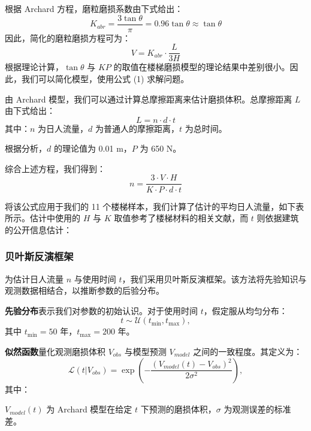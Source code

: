 \documentclass[11pt,a4paper]{ctexart}
\begin{document}
根据 Archard 方程，磨粒磨损系数由下式给出：
\begin{equation}
K_{abr}=\frac{3\tan\theta}{\pi}=0.96\tan\theta\approx\tan\theta \tag{5}
\end{equation}
因此，简化的磨粒磨损方程可为：
\begin{equation}
V=K_{abr}\cdot\frac{L}{3H} \tag{6}
\end{equation}
根据理论计算，$\tan\theta$ 与 $KP$ 的取值在楼梯磨损模型的理论结果中差别很小。因此，我们可以简化模型，使用公式 (1) 求解问题。

由 Archard 模型，我们可以通过计算总摩擦距离来估计磨损体积。总摩擦距离 $L$ 由下式给出：
\begin{equation}
L=n\cdot d\cdot t \tag{7}
\end{equation}
其中：$n$ 为日人流量，$d$ 为普通人的摩擦距离，$t$ 为总时间。

根据分析，$d$ 的理论值为 0.01 m，$P$ 为 650 N。

综合上述方程，我们得到：
\begin{equation}
n=\frac{3\cdot V\cdot H}{K\cdot P\cdot d\cdot t} \tag{8}
\end{equation}

将该公式应用于我们的 11 个楼梯样本，我们计算了估计的平均日人流量，如下表所示。估计中使用的 $H$ 与 $K$ 取值参考了楼梯材料的相关文献，而 $t$ 则依据建筑的公开信息估计：

\subsubsection{贝叶斯反演框架}

为估计日人流量 $n$ 与使用时间 $t$，我们采用贝叶斯反演框架。该方法将先验知识与观测数据相结合，以推断参数的后验分布。

\textbf{先验分布}表示我们对参数的初始认识。对于使用时间 $t$，假定服从均匀分布：
\begin{equation}
t\sim\mathcal{U}(t_{\min},t_{\max}), \tag{9}
\end{equation}
其中 $t_{\min}=50$ 年，$t_{\max}=200$ 年。

\textbf{似然函数}量化观测磨损体积 $V_{obs}$ 与模型预测 $V_{model}$ 之间的一致程度。其定义为：
\begin{equation}
\mathcal{L}(t|V_{obs})=\exp\left(-\frac{(V_{model}(t)-V_{obs})^2}{2\sigma^2}\right), \tag{10}
\end{equation}
其中：

$V_{model}(t)$ 为 Archard 模型在给定 $t$ 下预测的磨损体积，$\sigma$ 为观测误差的标准差。
\end{document}

